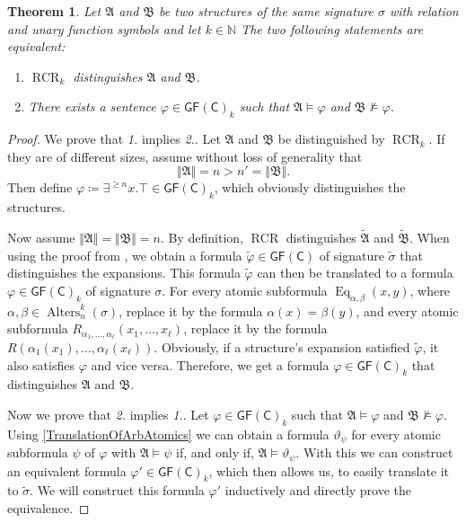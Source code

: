 \documentclass[a4paper,11pt,DIV=15]{scrartcl} %
\renewcommand{\phi}{\varphi}
\theoremstyle{plain}
\newtheorem{theorem}{Theorem}
\theoremstyle{definition}
\newcommand{\GFC}{\mathsf{GF}(\mathsf{C})}
\newcommand{\RCR}{\operatorname{RCR}}
\renewcommand{\theta}{\vartheta}
\begin{document}
\begin{theorem}
	Let $\mathfrak A$ and $\mathfrak B$ be two structures of the same signature $\sigma$ with relation and unary function symbols and let $k\in \mathbb{N}$
	The two following statements are equivalent:
	\begin{enumerate}
		\item $\RCR_k$ distinguishes $\mathfrak A$ and $\mathfrak B$.
		\item There exists a sentence $\phi\in\GFC_k$ such that $\mathfrak A\models \phi$ and $\mathfrak B\not\models \phi$.
	\end{enumerate}
\end{theorem}
\begin{proof}
	We prove that \emph{1.} implies \emph{2.}. 
	Let $\mathfrak A$ and $\mathfrak B$ be distinguished by $\RCR_k$.
	If they are of different sizes, assume without loss of generality that 
	$$\Vert \mathfrak A \Vert =n > n'=\Vert \mathfrak B \Vert.$$
	Then define $\phi\coloneqq \exists^{\geq n} x. \top\in \GFC_k$, which obviously distinguishes the structures.
	
	Now assume $\Vert \mathfrak A\Vert = \Vert \mathfrak B \Vert = n$.
	By definition, $\RCR$ distinguishes $\widetilde{\mathfrak A}$ and $\widetilde{\mathfrak B}$.
	When using the proof from \cite{scheidt2025ColorRefinement}, we obtain a formula $\widetilde{\phi}\in \GFC$ of signature $\widetilde{\sigma}$ that distinguishes the expansions.
	This formula $\widetilde{\phi}$ can then be translated to a formula $\phi\in\GFC_k$ of signature $\sigma$.
	For every atomic subformula $\operatorname{Eq}_{\alpha,\beta}(x,y)$, where $\alpha,\beta\in \operatorname{Alters}_n^k(\sigma)$, replace it by the formula $\alpha(x)=\beta(y)$,
	and every atomic subformula $R_{\alpha_1,\dots,\alpha_\ell}(x_1,\dots,x_\ell)$, replace it by the formula $R(\alpha_1(x_1),\dots,\alpha_\ell(x_\ell))$.
	Obviously, if a structure's expansion satisfied $\widetilde{\phi}$, it also satisfies $\phi$ and vice versa.
	Therefore, we get a formula $\phi\in \GFC_k$ that distinguishes $\mathfrak A$ and $\mathfrak B$.
	
	Now we prove that \emph{2.} implies \emph{1.}.
	Let $\phi\in \GFC_k$ such that $\mathfrak A\models \phi$ and $\mathfrak B\not\models \phi$.
	Using \cref{TranslationOfArbAtomics} we can obtain a formula $\theta_\psi$ for every atomic subformula $\psi$ of $\phi$ with $\mathfrak A\models \psi$ if, and only if, $\mathfrak A\models \theta_\psi$.
	With this we can construct an equivalent formula $\phi'\in\GFC_k$, which then allows us, to easily translate it to $\widetilde{\sigma}$.
	We will construct this formula $\phi'$ inductively and directly prove the equivalence.
	

\end{proof}
\end{document}
